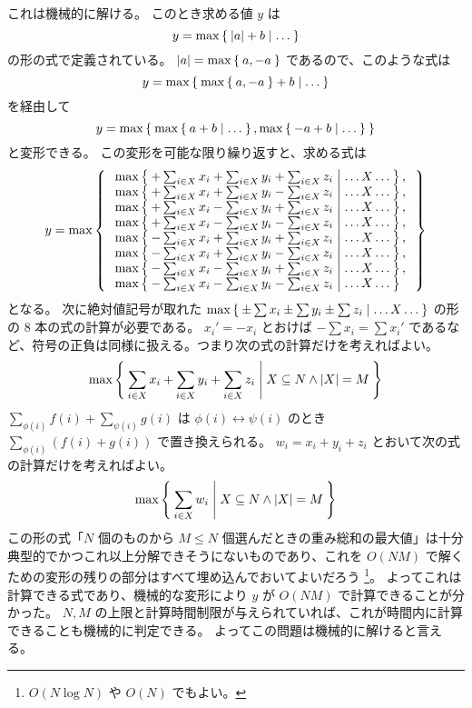\documentclass{ltjsarticle}
\begin{document}
これは機械的に解ける。
このとき求める値 $y$ は
\[
    y = \max \Set{ \lvert a \rvert + b | \dots }
\]
の形の式で定義されている。
$\lvert a \rvert = \max \Set{ a, -a }$ であるので、このような式は
\[
    y = \max \Set{ \max \Set{ a, -a } + b | \dots }
\]
を経由して
\[
    y = \max \Set{ \max \Set{ a + b | \dots }, \max \Set{ - a + b | \dots } }
\]
と変形できる。
この変形を可能な限り繰り返すと、求める式は
\[
    y = \max \Set{
        \begin{array}{l}
            \max \Set{ + \sum_{i \in X} x_i + \sum_{i \in X} y_i + \sum_{i \in X} z_i | \ldots X \ldots }, \\
            \max \Set{ + \sum_{i \in X} x_i + \sum_{i \in X} y_i - \sum_{i \in X} z_i | \ldots X \ldots }, \\
            \max \Set{ + \sum_{i \in X} x_i - \sum_{i \in X} y_i + \sum_{i \in X} z_i | \ldots X \ldots }, \\
            \max \Set{ + \sum_{i \in X} x_i - \sum_{i \in X} y_i - \sum_{i \in X} z_i | \ldots X \ldots }, \\
            \max \Set{ - \sum_{i \in X} x_i + \sum_{i \in X} y_i + \sum_{i \in X} z_i | \ldots X \ldots }, \\
            \max \Set{ - \sum_{i \in X} x_i + \sum_{i \in X} y_i - \sum_{i \in X} z_i | \ldots X \ldots }, \\
            \max \Set{ - \sum_{i \in X} x_i - \sum_{i \in X} y_i + \sum_{i \in X} z_i | \ldots X \ldots }, \\
            \max \Set{ - \sum_{i \in X} x_i - \sum_{i \in X} y_i - \sum_{i \in X} z_i | \ldots X \ldots }  \\
        \end{array}
    }
\]
となる。
次に絶対値記号が取れた $\max \Set{ \pm \sum x_i \pm \sum y_i \pm \sum z_i | \ldots X \ldots }$ の形の $8$ 本の式の計算が必要である。
$x_i' = - x_i$ とおけば $- \sum x_i = \sum x_i'$ であるなど、符号の正負は同様に扱える。つまり次の式の計算だけを考えればよい。
\[
    \max \Set{ \sum_{i \in X} x_i + \sum_{i \in X} y_i + \sum_{i \in X} z_i | X \subseteq N \land \lvert X \rvert = M }
\]
$\sum_{\phi(i)} f(i) + \sum_{\psi(i)} g(i)$ は $\phi(i) \leftrightarrow \psi(i)$ のとき $\sum_{\phi(i)} (f(i) + g(i))$ で置き換えられる。
$w_i = x_i + y_i + z_i$ とおいて次の式の計算だけを考えればよい。
\[
    \max \Set{ \sum_{i \in X} w_i | X \subseteq N \land \lvert X \rvert = M }
\]
この形の式「$N$ 個のものから $M \le N$ 個選んだときの重み総和の最大値」は十分典型的でかつこれ以上分解できそうにないものであり、これを $O(N M)$ で解くための変形の残りの部分はすべて埋め込んでおいてよいだろう \footnote{$O(N \log N)$ や $O(N)$ でもよい。}。
よってこれは計算できる式であり、機械的な変形により $y$ が $O(N M)$ で計算できることが分かった。
$N, M$ の上限と計算時間制限が与えられていれば、これが時間内に計算できることも機械的に判定できる。
よってこの問題は機械的に解けると言える。
\end{document}
